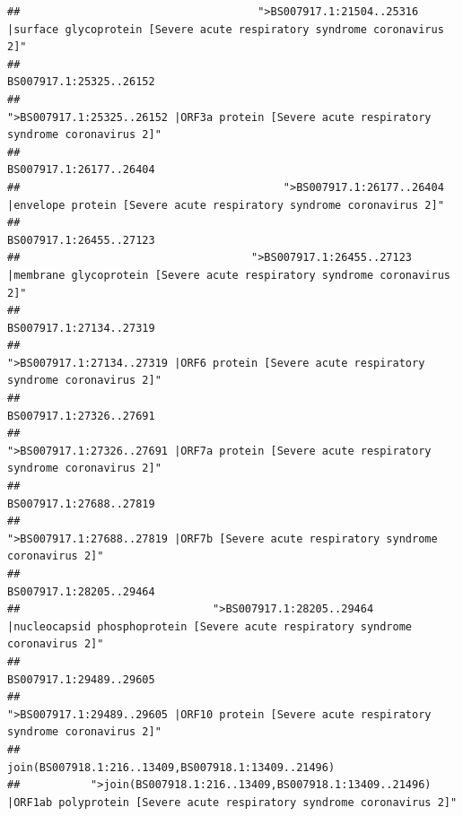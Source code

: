 \documentclass[
]{article}
\begin{document}
\begin{verbatim}
##                                     ">BS007917.1:21504..25316 |surface glycoprotein [Severe acute respiratory syndrome coronavirus 2]" 
##                                                                                                                BS007917.1:25325..26152 
##                                            ">BS007917.1:25325..26152 |ORF3a protein [Severe acute respiratory syndrome coronavirus 2]" 
##                                                                                                                BS007917.1:26177..26404 
##                                         ">BS007917.1:26177..26404 |envelope protein [Severe acute respiratory syndrome coronavirus 2]" 
##                                                                                                                BS007917.1:26455..27123 
##                                    ">BS007917.1:26455..27123 |membrane glycoprotein [Severe acute respiratory syndrome coronavirus 2]" 
##                                                                                                                BS007917.1:27134..27319 
##                                             ">BS007917.1:27134..27319 |ORF6 protein [Severe acute respiratory syndrome coronavirus 2]" 
##                                                                                                                BS007917.1:27326..27691 
##                                            ">BS007917.1:27326..27691 |ORF7a protein [Severe acute respiratory syndrome coronavirus 2]" 
##                                                                                                                BS007917.1:27688..27819 
##                                                    ">BS007917.1:27688..27819 |ORF7b [Severe acute respiratory syndrome coronavirus 2]" 
##                                                                                                                BS007917.1:28205..29464 
##                              ">BS007917.1:28205..29464 |nucleocapsid phosphoprotein [Severe acute respiratory syndrome coronavirus 2]" 
##                                                                                                                BS007917.1:29489..29605 
##                                            ">BS007917.1:29489..29605 |ORF10 protein [Severe acute respiratory syndrome coronavirus 2]" 
##                                                                                    join(BS007918.1:216..13409,BS007918.1:13409..21496) 
##           ">join(BS007918.1:216..13409,BS007918.1:13409..21496) |ORF1ab polyprotein [Severe acute respiratory syndrome coronavirus 2]" 

\end{verbatim}
\end{document}
